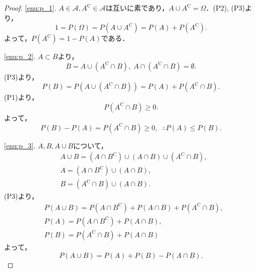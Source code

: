 \documentclass{jsreport}
\begin{document}
\begin{proof}
  \ref{enu:p_1}.
  $A \in \mathscr{A}, A^{\mathrm{C}} \in \mathscr{A}$は互いに素であり，$A \cup A^{\mathrm{C}} = \Omega$．(P2), (P3)より，
  \begin{equation}
    1 = P(\Omega) = P(A \cup A^{\mathrm{C}}) = P(A) + P(A^{\mathrm{C}}). \nonumber
  \end{equation}
  よって，$P(A^{\mathrm{C}}) = 1 - P(A)$である．

  \ref{enu:p_2}.
  $A \subset B$より，
  \begin{equation}
    B = A \cup (A^{\mathrm{C}} \cap B), \; A \cap (A^{\mathrm{C}} \cap B) = \emptyset. \nonumber
  \end{equation}
  (P3)より，
  \begin{equation}
    P(B) = P(A \cup (A^{\mathrm{C}} \cap B)) = P(A) + P(A^{\mathrm{C}} \cap B). \nonumber
  \end{equation}
  (P1)より，
  \begin{equation}
    P(A^{\mathrm{C}} \cap B) \geq 0. \nonumber
  \end{equation}
  よって，
  \begin{equation}
    P(B) - P(A) = P(A^{\mathrm{C}} \cap B) \geq 0, \; \; \therefore P(A) \leq P(B). \nonumber
  \end{equation}

  \ref{enu:p_3}.
  $A, B, A\cup B$について，
  \begin{align}
    &A \cup B = (A \cap B^{\mathrm{C}}) \cup (A \cap B) \cup (A^{\mathrm{C}} \cap B), \nonumber \\
    &A = (A \cap B^{\mathrm{C}}) \cup (A \cap B), \nonumber \\
    &B = (A^{\mathrm{C}} \cap B) \cup (A \cap B). \nonumber
  \end{align}
  (P3)より，
  \begin{align}
    &P(A \cup B) = P(A \cap B^{\mathrm{C}}) + P(A \cap B) + P(A^{\mathrm{C}} \cap B), \nonumber \\
    &P(A) = P(A \cap B^{\mathrm{C}}) + P(A \cap B), \nonumber \\
    &P(B) = P(A^{\mathrm{C}} \cap B) + P(A \cap B) \nonumber
  \end{align}
  よって，
  \begin{equation}
    P(A \cup B) = P(A) + P(B) - P(A \cap B). \nonumber
  \end{equation}


\end{proof}
\end{document}
